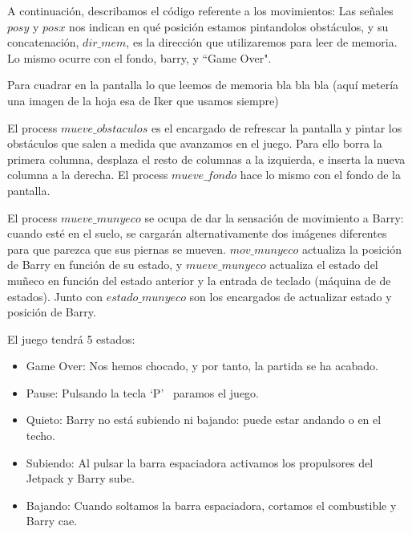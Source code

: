\documentclass[11pt, a4paper, spanish, openright, twoside]{book}
\begin{document}
A continuación, describamos el código referente a los movimientos:
Las señales $posy$ y $posx$ nos indican en qué posición estamos pintandolos obstáculos, y su concatenación, $dir\_mem$, es la dirección que utilizaremos para leer de memoria. Lo mismo ocurre con el fondo, barry, y ``Game Over".

Para cuadrar en la pantalla lo que leemos de memoria bla bla bla (aquí metería una imagen de la hoja esa de Iker que usamos siempre)

El process $mueve\_obstaculos$ es el encargado de refrescar la pantalla y pintar los obstáculos que salen a medida que avanzamos en el juego. Para ello borra la primera columna, desplaza el resto de columnas a la izquierda, e inserta la nueva columna a la derecha. El process $mueve\_fondo$ hace lo mismo con el fondo de la pantalla.

El process $mueve\_munyeco$ se ocupa de dar la sensación de movimiento a Barry: cuando esté en el suelo, se cargarán alternativamente dos imágenes diferentes para que parezca que sus piernas se mueven.
$mov\_munyeco$ actualiza la posición de Barry en función de su estado, y $mueve\_munyeco$ actualiza el estado del muñeco en función del estado anterior y la entrada de teclado (máquina de de estados). Junto con $estado\_munyeco$ son los encargados de actualizar estado y posición de Barry.

El juego tendrá 5 estados:
\begin{itemize}
\item Game Over: Nos hemos chocado, y por tanto, la partida se ha acabado.
\item Pause: Pulsando la tecla `P'  \ paramos el juego.
\item Quieto: Barry no está subiendo ni bajando: puede estar andando o en el techo.
\item Subiendo: Al pulsar la barra espaciadora activamos los propulsores del Jetpack y Barry sube.
\item Bajando: Cuando soltamos la barra espaciadora, cortamos el combustible y Barry cae.
\end{itemize}
\end{document}
